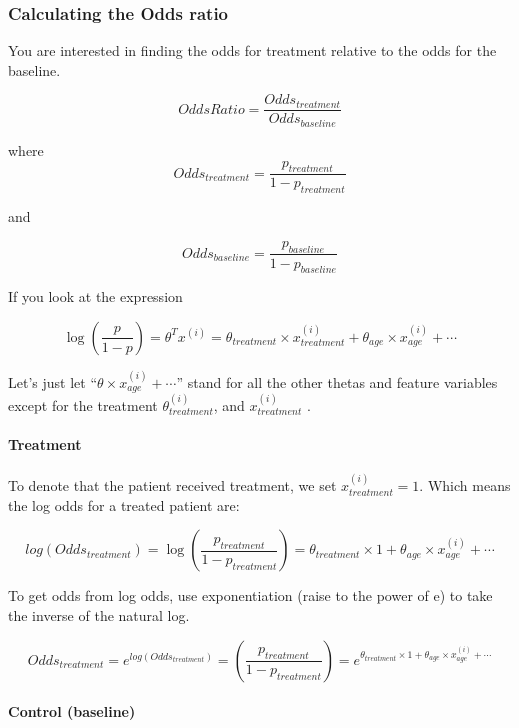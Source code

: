\documentclass[11pt]{article}
\begin{document}
    \hypertarget{calculating-the-odds-ratio}{%
\subsubsection{Calculating the Odds
ratio}\label{calculating-the-odds-ratio}}

You are interested in finding the odds for treatment relative to the
odds for the baseline.

\[ OddsRatio = \frac{Odds_{treatment}}{Odds_{baseline}}\]

where \[Odds_{treatment} = \frac{p_{treatment}}{1-p_{treatment}}\]

and

\[Odds_{baseline} = \frac{p_{baseline}}{1-p_{baseline}}\]

    If you look at the expression

\[\log \left(\frac{p}{1-p} \right)= \theta^T x^{(i)} = \theta_{treatment} \times x_{treatment}^{(i)} + \theta_{age} \times x_{age}^{(i)} + \cdots\]

Let's just let ``\(\theta \times x_{age}^{(i)} + \cdots\)'' stand for
all the other thetas and feature variables except for the treatment
\(\theta_{treatment}^{(i)}\), and \(x_{treatment}^{(i)}\) .

    \hypertarget{treatment}{%
\paragraph{Treatment}\label{treatment}}

To denote that the patient received treatment, we set
\(x_{treatment}^{(i)} = 1\). Which means the log odds for a treated
patient are:

\[ log( Odds_{treatment}) = \log \left(\frac{p_{treatment}}{1-p_{treatment}} \right) = \theta_{treatment} \times 1 + \theta_{age} \times x_{age}^{(i)} + \cdots\]

To get odds from log odds, use exponentiation (raise to the power of e)
to take the inverse of the natural log.

\[Odds_{treatment} = e^{log( Odds_{treatment})} = \left(\frac{p_{treatment}}{1-p_{treatment}} \right) = e^{\theta_{treatment} \times 1 + \theta_{age} \times x_{age}^{(i)} + \cdots}\]

    \hypertarget{control-baseline}{%
\paragraph{Control (baseline)}\label{control-baseline}}
\end{document}
